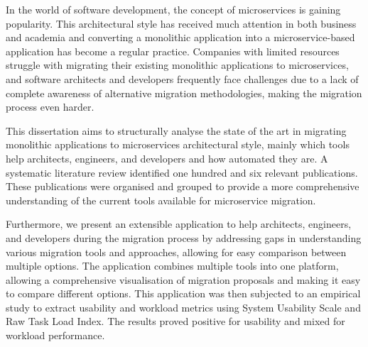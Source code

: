 In the world of software development, the concept of microservices is gaining
popularity. This architectural style has received much attention in both
business and academia and converting a monolithic application into a
microservice-based application has become a regular practice. Companies with
limited resources struggle with migrating their existing monolithic
applications to microservices, and software architects and developers
frequently face challenges due to a lack of complete awareness of alternative
migration methodologies, making the migration process even harder.

This dissertation aims to structurally analyse the state of the art in
migrating monolithic applications to microservices architectural style, mainly
which tools help architects, engineers, and developers and how automated they
are. A systematic literature review identified one hundred and six relevant
publications. These publications were organised and grouped to provide a more
comprehensive understanding of the current tools available for microservice
migration.

Furthermore, we present an extensible application to help architects,
engineers, and developers during the migration process by addressing gaps in
understanding various migration tools and approaches, allowing for easy
comparison between multiple options. The application combines multiple tools
into one platform, allowing a comprehensive visualisation of migration
proposals and making it easy to compare different options. This application was
then subjected to an empirical study to extract usability and workload metrics
using System Usability Scale and Raw Task Load Index. The results proved
positive for usability and mixed for workload performance.
